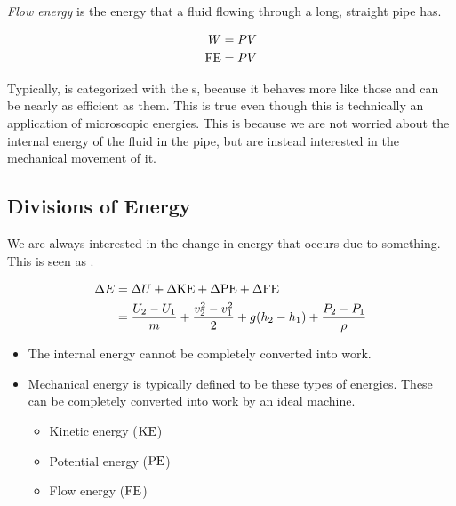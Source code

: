 \begin{definition}\label{def:Flow_Energy}
  \emph{Flow energy} is the energy that a fluid flowing through a long, straight pipe has.

  \begin{equation}\label{eq:Flow_Energy}
    \begin{aligned}
      W &= P V \\
      \textrm{FE} &= P V \\
    \end{aligned}
  \end{equation}

  \begin{remark}
    Typically,  is categorized with the s, because it behaves more like those and can be nearly as efficient as them.
    This is true even though this is technically an application of microscopic energies.
    This is because we are not worried about the internal energy of the fluid in the pipe, but are instead interested in the mechanical movement of it.
  \end{remark}
\end{definition}

\subsection{Divisions of Energy}\label{subsec:Divisions_of_Energy}
We are always interested in the change in energy that occurs due to something.
This is seen as .

\begin{equation}\label{eq:Change_Total_Energy}
  \begin{aligned}
    \Delta E &= \Delta U + \Delta \textrm{KE} + \Delta \textrm{PE} + \Delta \textrm{FE} \\
    &= \frac{U_{2} - U_{1}}{m} + \frac{v_{2}^{2} - v_{1}^{2}}{2} + g (h_{2} - h_{1}) + \frac{P_{2} - P_{1}}{\rho} \\
  \end{aligned}
\end{equation}
\begin{itemize}[noitemsep]
\item The internal energy cannot be completely converted into work.
\item Mechanical energy is typically defined to be these types of energies.
  These can be completely converted into work by an ideal machine.
  \begin{itemize}[noitemsep]
  \item Kinetic energy ($\textrm{KE}$)
  \item Potential energy ($\textrm{PE}$)
  \item Flow energy ($\textrm{FE}$)
  \end{itemize}
\end{itemize}


